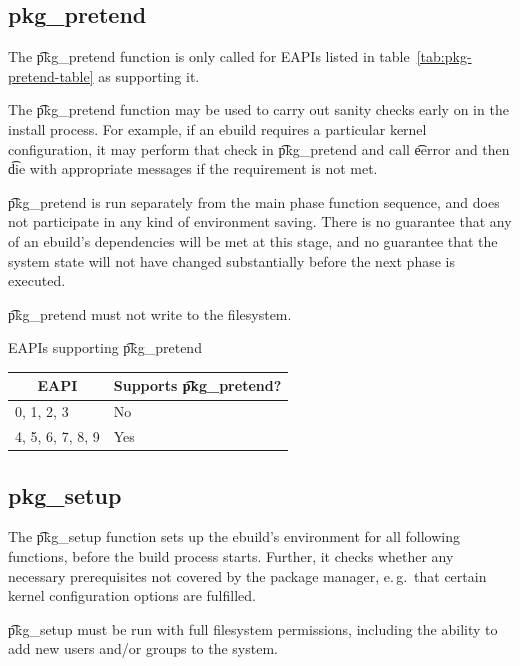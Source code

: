 \subsection{pkg_pretend}

 The \t{pkg_pretend} function is only called for EAPIs listed in
table~\ref{tab:pkg-pretend-table} as supporting it.

The \t{pkg_pretend} function may be used to carry out sanity checks early on in the install
process. For example, if an ebuild requires a particular kernel configuration, it may perform that
check in \t{pkg_pretend} and call \t{eerror} and then \t{die} with appropriate messages if the
requirement is not met.

\t{pkg_pretend} is run separately from the main phase function sequence, and does not participate
in any kind of environment saving. There is no guarantee that any of an ebuild's dependencies will
be met at this stage, and no guarantee that the system state will not have changed substantially
before the next phase is executed.

\t{pkg_pretend} must not write to the filesystem.

\begin{centertable}{EAPIs supporting \t{pkg_pretend}}
    \label{tab:pkg-pretend-table}
    \begin{tabular}{ll}
      \toprule
      \multicolumn{1}{c}{\textbf{EAPI}} &
      \multicolumn{1}{c}{\textbf{Supports \t{pkg_pretend}?}} \\
      \midrule
      0, 1, 2, 3        & No  \\
      4, 5, 6, 7, 8, 9  & Yes \\
      \bottomrule
    \end{tabular}
\end{centertable}

\subsection{pkg_setup}

The \t{pkg_setup} function sets up the ebuild's environment for all following functions, before
the build process starts. Further, it checks whether any necessary prerequisites not covered
by the package manager, e.\,g.\ that certain kernel configuration options are fulfilled.

\t{pkg_setup} must be run with full filesystem permissions, including the ability to add new users
and/or groups to the system.

